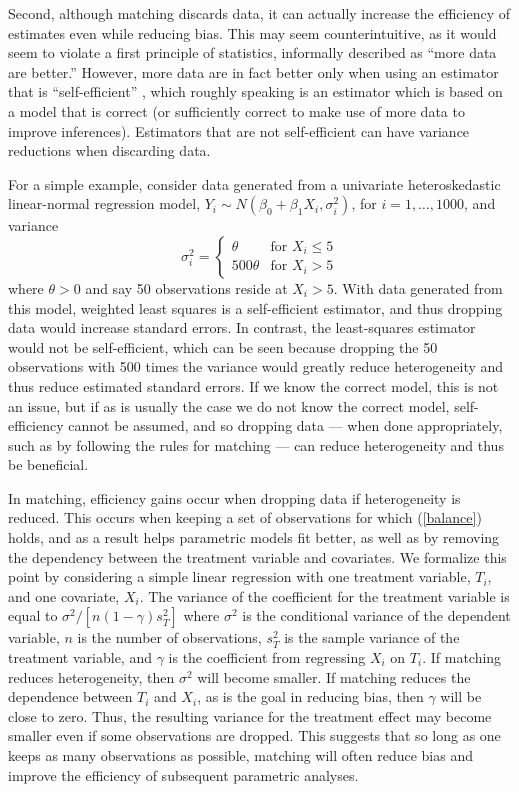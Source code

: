 \documentclass[11pt,titlepage]{article}
\begin{document}
Second, although matching discards data, it can actually increase the
efficiency of estimates even while reducing bias.  This may seem 
counterintuitive, as it would seem to violate a first principle of
statistics, informally described as ``more data are better.''
However, more data are in fact better only when using an estimator
that is ``self-efficient'' \citep{MenRom03}, which roughly speaking is
an estimator which is based on a model that is correct (or
sufficiently correct to make use of more data to improve inferences).
Estimators that are not self-efficient can have variance reductions
when discarding data.  

For a simple example, consider data generated from a univariate
heteroskedastic linear-normal regression model, $Y_i\sim
N(\beta_0+\beta_1 X_i,\sigma_i^2)$, for $i=1,\dots,1000$, and variance
\begin{equation*}
  \sigma_i^2 =
  \begin{cases}
    \theta & \text{for $X_i\leq 5$}\\
    500\theta & \text{for $X_i>5$}
  \end{cases}
\end{equation*}
where $\theta>0$ and say 50 observations reside at $X_i>5$.  With data
generated from this model, weighted least squares is a self-efficient
estimator, and thus dropping data would increase standard errors.  In
contrast, the least-squares estimator would not be self-efficient,
which can be seen because dropping the 50 observations with 500 times
the variance would greatly reduce heterogeneity and thus reduce
estimated standard errors.  If we know the correct model, this is not
an issue, but if as is usually the case we do not know the correct
model, self-efficiency cannot be assumed, and so dropping data ---
when done appropriately, such as by following the rules for matching
--- can reduce heterogeneity and thus be beneficial.

In matching, efficiency gains occur when dropping data if
heterogeneity is reduced.  This occurs when keeping a set of
observations for which (\ref{balance}) holds, and as a result helps
parametric models fit better, as well as by removing the dependency
between the treatment variable and covariates.  We formalize this
point by considering a simple linear regression with one treatment
variable, $T_i$, and one covariate, $X_i$.  The variance of the
coefficient for the treatment variable is equal to $\sigma^2/[n
(1-\gamma) s^2_T]$ where $\sigma^2$ is the conditional variance of the
dependent variable, $n$ is the number of observations, $s^2_T$ is the
sample variance of the treatment variable, and $\gamma$ is the
coefficient from regressing $X_i$ on $T_i$. If matching reduces
heterogeneity, then $\sigma^2$ will become smaller.  If matching
reduces the dependence between $T_i$ and $X_i$, as is the goal in
reducing bias, then $\gamma$ will be close to zero.  Thus, the
resulting variance for the treatment effect may become smaller even if
some observations are dropped.  This suggests that so long as one
keeps as many observations as possible, matching will often reduce
bias and improve the efficiency of subsequent parametric analyses.
\end{document}
